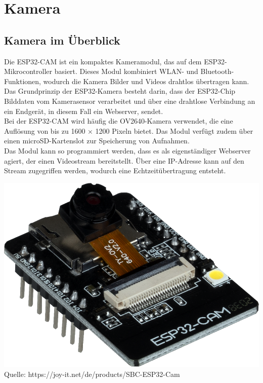 \documentclass[ngerman,12pt,a4paper]{article}
\begin{document}
	\newpage
	\section{Kamera}
		\subsection{Kamera im Überblick} %
		Die ESP32-CAM ist ein kompaktes Kameramodul, das auf dem ESP32-Mikrocontroller basiert. Dieses Modul kombiniert WLAN- und Bluetooth-Funktionen, wodurch die Kamera Bilder und Videos drahtlos übertragen kann. Das Grundprinzip der ESP32-Kamera besteht darin, dass der ESP32-Chip Bilddaten vom Kamerasensor verarbeitet und über eine drahtlose Verbindung an ein Endgerät, in diesem Fall ein Webserver, sendet. \\[0.5cm]
		Bei der ESP32-CAM wird häufig die OV2640-Kamera verwendet, die eine Auflösung von bis zu 1600 × 1200 Pixeln bietet. Das Modul verfügt zudem über einen microSD-Kartenslot zur Speicherung von Aufnahmen.\\[0.5cm]
		Das Modul kann so programmiert werden, dass es als eigenständiger Webserver agiert, der einen Videostream bereitstellt. Über eine IP-Adresse kann auf den Stream zugegriffen werden, wodurch eine Echtzeitübertragung entsteht. 
		\begin{center}
			\begin{minipage}{0.9\textwidth}
				\centering
				\includegraphics[width=\textwidth]{Pictures/esp32_cam}
				\label{fig:esp32_cam}
				\vspace{5pt}
				{\small Quelle: {https://joy-it.net/de/products/SBC-ESP32-Cam}}
			\end{minipage}
		\end{center}
		\newpage \noindent
\end{document}
